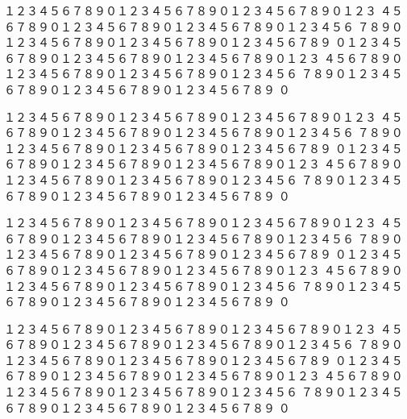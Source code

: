 \noindent
１２３４５６７８９０１２３４５６７８９０１２３４５６７８９０１２３
４５６７８９０１２３４５６７８９０１２３４５６７８９０１２３４５６
７８９０１２３４５６７８９０１２３４５６７８９０１２３４５６７８９
０１２３４５６７８９０１２３４５６７８９０１２３４５６７８９０１２３
４５６７８９０１２３４５６７８９０１２３４５６７８９０１２３４５６
７８９０１２３４５６７８９０１２３４５６７８９０１２３４５６７８９
０

\noindent
１２３４５６７８９０１２３４５６７８９０１２３４５６７８９０１２３
４５６７８９０１２３４５６７８９０１２３４５６７８９０１２３４５６
７８９０１２３４５６７８９０１２３４５６７８９０１２３４５６７８９
０１２３４５６７８９０１２３４５６７８９０１２３４５６７８９０１２３
４５６７８９０１２３４５６７８９０１２３４５６７８９０１２３４５６
７８９０１２３４５６７８９０１２３４５６７８９０１２３４５６７８９
０

\noindent
１２３４５６７８９０１２３４５６７８９０１２３４５６７８９０１２３
４５６７８９０１２３４５６７８９０１２３４５６７８９０１２３４５６
７８９０１２３４５６７８９０１２３４５６７８９０１２３４５６７８９
０１２３４５６７８９０１２３４５６７８９０１２３４５６７８９０１２３
４５６７８９０１２３４５６７８９０１２３４５６７８９０１２３４５６
７８９０１２３４５６７８９０１２３４５６７８９０１２３４５６７８９
０

\noindent
１２３４５６７８９０１２３４５６７８９０１２３４５６７８９０１２３
４５６７８９０１２３４５６７８９０１２３４５６７８９０１２３４５６
７８９０１２３４５６７８９０１２３４５６７８９０１２３４５６７８９
０１２３４５６７８９０１２３４５６７８９０１２３４５６７８９０１２３
４５６７８９０１２３４５６７８９０１２３４５６７８９０１２３４５６
７８９０１２３４５６７８９０１２３４５６７８９０１２３４５６７８９
０

